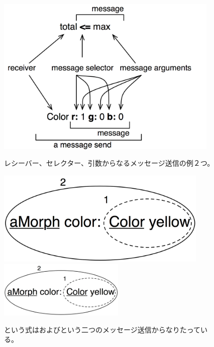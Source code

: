 \documentclass[a4paper,10pt,twoside]{book}
\begin{document}
\begin{figure}[htb]
\begin{minipage}{0.53\textwidth}
	\begin{center}
	\includegraphics[width=0.95\textwidth]{message}
	\caption{レシーバー、セレクター、引数からなるメッセージ送信の例２つ。}\end{center}
\end{minipage}
\hfill
\begin{minipage}{0.43\textwidth}
	\begin{center}
	\ifluluelse
		{\includegraphics[width=0.9\textwidth]{uKeyUnOne}}
		{\includegraphics[width=6cm]{uKeyUnOne}}
	\caption{という式はおよびという二つのメッセージ送信からなりたっている。}
	\end{center}
\end{minipage}
\end{figure}
\end{document}
